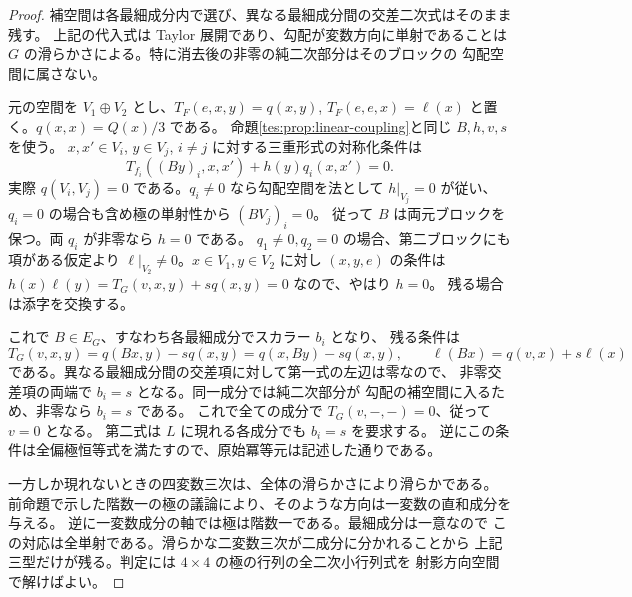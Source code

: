 \begin{proof}
補空間は各最細成分内で選び、異なる最細成分間の交差二次式はそのまま残す。
上記の代入式は Taylor 展開であり、勾配が変数方向に単射であることは
$G$ の滑らかさによる。特に消去後の非零の純二次部分はそのブロックの
勾配空間に属さない。

元の空間を $V_1\oplus V_2$ とし、$T_F(e,x,y)=q(x,y)$,
$T_F(e,e,x)=\ell(x)$ と置く。$q(x,x)=Q(x)/3$ である。
命題\ref{tes:prop:linear-coupling}と同じ $B,h,v,s$ を使う。
$x,x'\in V_i$, $y\in V_j$, $i\ne j$ に対する三重形式の対称化条件は
\[
 T_{f_i}((By)_i,x,x')+h(y)q_i(x,x')=0 .
\]
実際 $q(V_i,V_j)=0$ である。$q_i\ne0$ なら勾配空間を法として
$h|_{V_j}=0$ が従い、$q_i=0$ の場合も含め極の単射性から $(BV_j)_i=0$。
従って $B$ は両元ブロックを保つ。両 $q_i$ が非零なら $h=0$ である。
$q_1\ne0,q_2=0$ の場合、第二ブロックにも項がある仮定より
$\ell|_{V_2}\ne0$。$x\in V_1,y\in V_2$ に対し $(x,y,e)$ の条件は
$h(x)\ell(y)=T_G(v,x,y)+sq(x,y)=0$ なので、やはり $h=0$。
残る場合は添字を交換する。

これで $B\in E_G$、すなわち各最細成分でスカラー $b_i$ となり、
残る条件は
\[
 T_G(v,x,y)=q(Bx,y)-sq(x,y)=q(x,By)-sq(x,y),\qquad
 \ell(Bx)=q(v,x)+s\ell(x)
\]
である。異なる最細成分間の交差項に対して第一式の左辺は零なので、
非零交差項の両端で $b_i=s$ となる。同一成分では純二次部分が
勾配の補空間に入るため、非零なら $b_i=s$ である。
これで全ての成分で $T_G(v,-,-)=0$、従って $v=0$ となる。
第二式は $L$ に現れる各成分でも $b_i=s$ を要求する。
逆にこの条件は全偏極恒等式を満たすので、原始冪等元は記述した通りである。

一方しか現れないときの四変数三次は、全体の滑らかさにより滑らかである。
前命題で示した階数一の極の議論により、そのような方向は一変数の直和成分を与える。
逆に一変数成分の軸では極は階数一である。最細成分は一意なので
この対応は全単射である。滑らかな二変数三次が二成分に分かれることから
上記三型だけが残る。判定には $4\times4$ の極の行列の全二次小行列式を
射影方向空間で解けばよい。
\end{proof}

